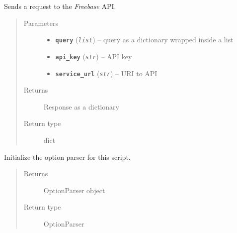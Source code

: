 \documentclass[letterpaper,10pt,english]{sphinxmanual}
\begin{document}
\begin{fulllineitems}
\label{src.prep.relations:src.prep.relations.relations.freebase_request}
Sends a request to the \emph{Freebase} API.
\begin{quote}\begin{description}
\item[{Parameters}] \leavevmode\begin{itemize}
\item {} 
\textbf{\texttt{query}} (\emph{\texttt{list}}) --  query as a dictionary wrapped inside a list

\item {} 
\textbf{\texttt{api\_key}} (\emph{\texttt{str}}) -- API key

\item {} 
\textbf{\texttt{service\_url}} (\emph{\texttt{str}}) -- URI to API

\end{itemize}

\item[{Returns}] \leavevmode
Response as a dictionary

\item[{Return type}] \leavevmode
dict

\end{description}\end{quote}

\end{fulllineitems}


\begin{fulllineitems}
\label{src.prep.relations:src.prep.relations.relations.init_optparser}
Initialize the option parser for this script.
\begin{quote}\begin{description}
\item[{Returns}] \leavevmode
OptionParser object

\item[{Return type}] \leavevmode
OptionParser

\end{description}\end{quote}

\end{fulllineitems}
\end{document}

